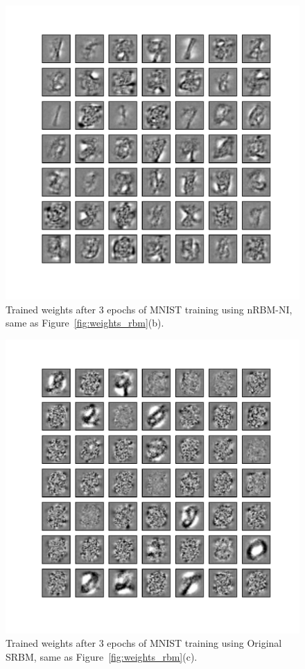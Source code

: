 \begin{figure}
	\centering
	\includegraphics[width=\textwidth]{pics_sdlm/33_MNIST_RBM_noise/2_60000_0.pdf}
	\caption[Trained weights of nRBM-NI, same as Figure~\ref{fig:weights_rbm}(b).]{Trained weights after 3 epochs of MNIST training using nRBM-NI, same as Figure~\ref{fig:weights_rbm}(b).}
	\label{fig:weights_rbm2}
\end{figure}

\clearpage
\begin{figure}
	\centering
	\includegraphics[width=\textwidth]{pics_sdlm/50_MNIST_SRBM_original/2_60000_0.pdf}
	\caption[Trained weights of SRBM, same as Figure~\ref{fig:weights_rbm}(c).]{Trained weights after 3 epochs of MNIST training using Original SRBM, same as Figure~\ref{fig:weights_rbm}(c).}
	\label{fig:weights_rbm3}
\end{figure}

